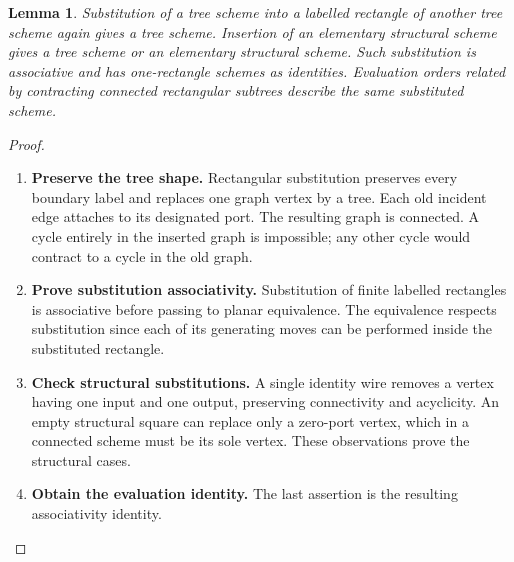 \documentclass[11pt,reqno]{amsart}
\theoremstyle{plain}
\newtheorem{lemma}[theorem]{Lemma}
\theoremstyle{definition}
\theoremstyle{remark}
\numberwithin{equation}{section}
\begin{document}
\begin{lemma}\label{lem:shapes}
Substitution of a tree scheme into a labelled rectangle of another tree
scheme again gives a tree scheme. Insertion of an elementary structural
scheme gives a tree scheme or an elementary structural scheme. Such
substitution is associative and has one-rectangle schemes as identities.
Evaluation orders related by contracting connected rectangular subtrees
describe the same substituted scheme.
\end{lemma}
\begin{proof}\leavevmode
\begin{enumerate}
\item \textbf{Preserve the tree shape.} Rectangular substitution preserves every boundary label and replaces one
graph vertex by a tree. Each old incident edge attaches to its designated
port. The resulting graph is connected. A cycle entirely in the inserted
graph is impossible; any other cycle would contract to a cycle in the old
graph.

\item \textbf{Prove substitution associativity.} Substitution of finite labelled rectangles is associative before
passing to planar equivalence. The equivalence respects substitution since
each of its generating moves can be performed inside the substituted
rectangle.

\item \textbf{Check structural substitutions.} A single identity wire removes a vertex having one input and
one output, preserving connectivity and acyclicity. An empty structural
square can replace only a zero-port vertex, which in a connected scheme
must be its sole vertex. These observations prove the structural cases.

\item \textbf{Obtain the evaluation identity.} The last assertion is the resulting associativity identity.\qedhere
\end{enumerate}
\end{proof}
\end{document}

